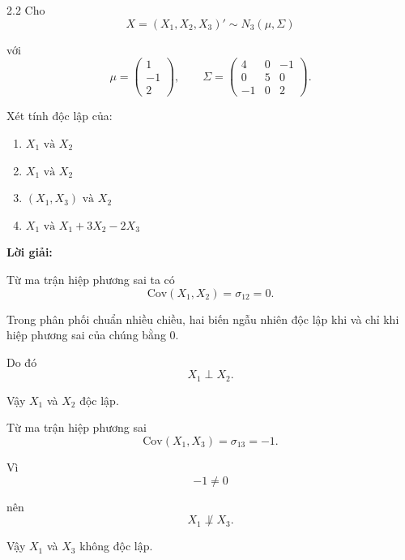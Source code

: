 \begin{question}{2.2}
Cho
\[
X = (X_1, X_2, X_3)' \sim N_3(\mu, \Sigma)
\]

với
\[
\mu =
\begin{pmatrix}
1\\
-1\\
2
\end{pmatrix},
\qquad
\Sigma =
\begin{pmatrix}
4 & 0 & -1\\
0 & 5 & 0\\
-1 & 0 & 2
\end{pmatrix}.
\]

Xét tính độc lập của:

\begin{enumerate}
\item[(a)] $X_1 \text{ và } X_2$
\item[(b)] $X_1 \text{ và } X_2$
\item[(c)] $(X_1, X_3) \text{ và } X_2$
\item[(d)] $X_1 \text{ và } X_1 + 3X_2 - 2X_3$
\end{enumerate}

\textbf{Lời giải:}

\begin{subquestion}
\begin{answer}

Từ ma trận hiệp phương sai ta có
\[
\mathrm{Cov}(X_1, X_2) = \sigma_{12} = 0.
\]

Trong phân phối chuẩn nhiều chiều, hai biến ngẫu nhiên độc lập khi và chỉ khi hiệp phương sai của chúng bằng $0$.

Do đó
\[
X_1 \perp X_2 .
\]

Vậy $X_1$ và $X_2$ độc lập.

\end{answer}
\end{subquestion}

\begin{subquestion}
\begin{answer}

Từ ma trận hiệp phương sai
\[
\mathrm{Cov}(X_1, X_3) = \sigma_{13} = -1.
\]

Vì
\[
-1 \ne 0
\]

nên
\[
X_1 \not\perp X_3 .
\]

Vậy $X_1$ và $X_3$ không độc lập.

\end{answer}
\end{subquestion}


\end{question}
